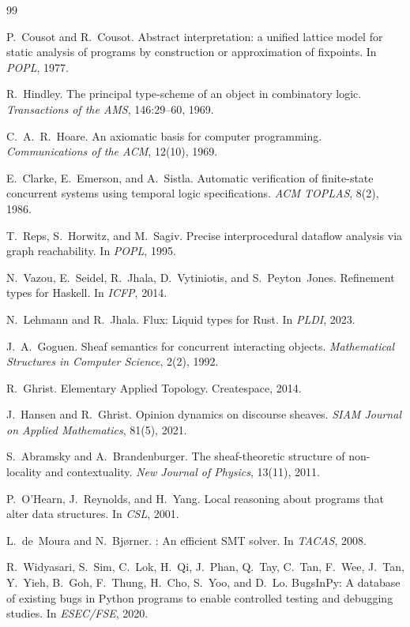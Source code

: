 \documentclass[acmsmall,screen,review,anonymous]{acmart}
\theoremstyle{remark}
\begin{document}

\begin{thebibliography}{99}

P.~Cousot and R.~Cousot.
\newblock Abstract interpretation: a unified lattice model for static analysis
  of programs by construction or approximation of fixpoints.
\newblock In \emph{POPL}, 1977.

R.~Hindley.
\newblock The principal type-scheme of an object in combinatory logic.
\newblock \emph{Transactions of the AMS}, 146:29--60, 1969.

C.~A.~R.~Hoare.
\newblock An axiomatic basis for computer programming.
\newblock \emph{Communications of the ACM}, 12(10), 1969.

E.~Clarke, E.~Emerson, and A.~Sistla.
\newblock Automatic verification of finite-state concurrent systems using
  temporal logic specifications.
\newblock \emph{ACM TOPLAS}, 8(2), 1986.

T.~Reps, S.~Horwitz, and M.~Sagiv.
\newblock Precise interprocedural dataflow analysis via graph reachability.
\newblock In \emph{POPL}, 1995.

N.~Vazou, E.~Seidel, R.~Jhala, D.~Vytiniotis, and S.~Peyton~Jones.
\newblock Refinement types for {Haskell}.
\newblock In \emph{ICFP}, 2014.

N.~Lehmann and R.~Jhala.
\newblock Flux: Liquid types for {Rust}.
\newblock In \emph{PLDI}, 2023.

J.~A.~Goguen.
\newblock Sheaf semantics for concurrent interacting objects.
\newblock \emph{Mathematical Structures in Computer Science}, 2(2), 1992.

R.~Ghrist.
\newblock Elementary Applied Topology.
\newblock Createspace, 2014.

J.~Hansen and R.~Ghrist.
\newblock Opinion dynamics on discourse sheaves.
\newblock \emph{SIAM Journal on Applied Mathematics}, 81(5), 2021.

S.~Abramsky and A.~Brandenburger.
\newblock The sheaf-theoretic structure of non-locality and contextuality.
\newblock \emph{New Journal of Physics}, 13(11), 2011.

P.~O'Hearn, J.~Reynolds, and H.~Yang.
\newblock Local reasoning about programs that alter data structures.
\newblock In \emph{CSL}, 2001.

L.~de~Moura and N.~Bj{\o}rner.
: An efficient {SMT} solver.
\newblock In \emph{TACAS}, 2008.

R.~Widyasari, S.~Sim, C.~Lok, H.~Qi, J.~Phan, Q.~Tay, C.~Tan,
  F.~Wee, J.~Tan, Y.~Yieh, B.~Goh, F.~Thung, H.~Cho, S.~Yoo,
  and D.~Lo.
\newblock Bugs{I}n{P}y: A database of existing bugs in {Python} programs to
  enable controlled testing and debugging studies.
\newblock In \emph{ESEC/FSE}, 2020.

\end{thebibliography}
\end{document}
